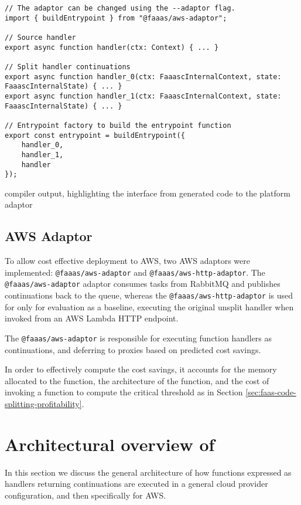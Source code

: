 \begin{listing}[H]
\begin{verbatim}
// The adaptor can be changed using the --adaptor flag.
import { buildEntrypoint } from "@faaas/aws-adaptor";

// Source handler
export async function handler(ctx: Context) { ... }

// Split handler continuations
export async function handler_0(ctx: FaaascInternalContext, state: FaaascInternalState) { ... }
export async function handler_1(ctx: FaaascInternalContext, state: FaaascInternalState) { ... }

// Entrypoint factory to build the entrypoint function
export const entrypoint = buildEntrypoint({
    handler_0,
    handler_1,
    handler
});
\end{verbatim}
\caption{\faaasc{} compiler output, highlighting the interface from generated code to the platform adaptor}
\label{listing:faaasc-compiler-adaptor-output}
\end{listing}

\subsection{AWS Adaptor}
To allow cost effective deployment to AWS, two \faaasc{} AWS adaptors were implemented: \verb|@faaas/aws-adaptor| and \verb|@faaas/aws-http-adaptor|. The \verb|@faaas/aws-adaptor| adaptor consumes tasks from RabbitMQ and publishes continuations back to the queue, whereas the \verb|@faaas/aws-http-adaptor| is used for only for evaluation as a baseline, executing the original unsplit handler when invoked from an AWS Lambda HTTP endpoint.

The \verb|@faaas/aws-adaptor| is responsible for executing function handlers as continuations, and deferring to proxies based on predicted cost savings.

In order to effectively compute the cost savings, it accounts for the memory allocated to the function, the architecture of the function, and the cost of invoking a function to compute the critical threshold as in Section \ref{sec:faas-code-splitting-profitability}.

\section{Architectural overview of \faaas{}}
In this section we discuss the general architecture of how functions expressed as handlers returning continuations are executed in a general cloud provider configuration, and then specifically for AWS.

